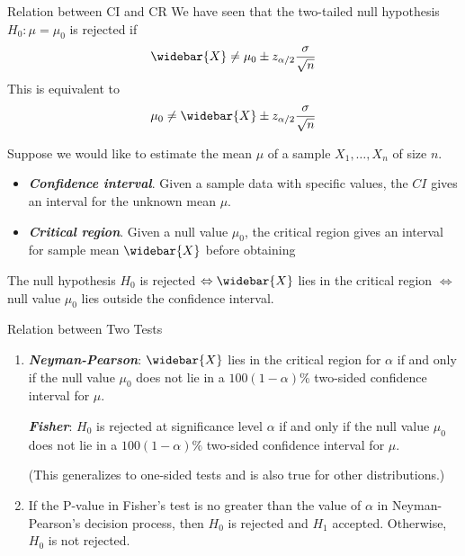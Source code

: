 \documentclass{beamer}
\newcommand{\bb}[1]{\textcolor{antiquefuchsia}{\textbf{\textit{#1}}}}
\begin{document}
\begin{frame}{Relation between CI and CR}
We have seen that the two-tailed null hypothesis $H_{0}: \mu=\mu_{0}$ is rejected if
$$
\widebar{X} \neq \mu_{0} \pm z_{\alpha / 2} \frac{\sigma}{\sqrt{n}}
$$
This is equivalent to
$$
\mu_{0} \neq \widebar{X} \pm z_{\alpha / 2} \frac{\sigma}{\sqrt{n}}
$$

Suppose we would like to estimate the mean $\mu$ of a sample $X_{1}, \ldots, X_{n}$ of size $n$.
\begin{itemize}
\item \bb{Confidence interval}. Given a sample data with specific values, the $CI$ gives an interval for the unknown mean $\mu$.
\item \bb{Critical region}. Given a null value $\mu_{0}$, the critical region gives an interval for sample mean $\widebar{X}$ before obtaining 
\end{itemize}
The null hypothesis $H_{0}$ is rejected $\Leftrightarrow \widebar{X}$ lies in the critical region $\Leftrightarrow$ null value $\mu_{0}$ lies outside the confidence interval.
\end{frame}

\begin{frame}{Relation between Two Tests}
\begin{enumerate}
\item 
\bb{Neyman-Pearson}: $\widebar{X}$ lies in the critical region for $\alpha$ if and only if the null value $\mu_{0}$ does not lie in a $100(1-\alpha) \%$ two-sided confidence interval for $\mu$.

\bb{Fisher}: $H_{0}$ is rejected at significance level $\alpha$ if and only if the null value $\mu_{0}$ does not lie in a $100(1-\alpha) \%$ two-sided confidence interval for $\mu$.

(This generalizes to one-sided tests and is also true for other distributions.)
\item If the P-value in Fisher's test is no greater than the value of $\alpha$ in Neyman-Pearson's decision process, then $H_{0}$ is rejected and $H_{1}$ accepted. Otherwise, $H_{0}$ is not rejected.
\end{enumerate}
\end{frame}
\end{document}
